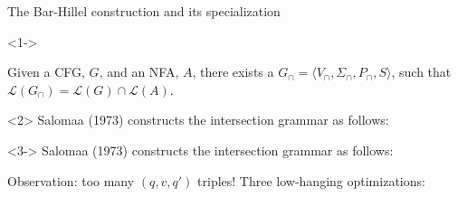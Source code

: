 \documentclass{beamer}
\begin{document}
\begin{frame}[t,fragile]{The Bar-Hillel construction and its specialization}
  \begin{onlyenv}<1->
  \begin{theorem}
    Given a CFG, $G$, and an NFA, $A$, there exists a $G_\cap = \langle V_\cap, \Sigma_\cap, P_\cap, S\rangle$, such that $\mathcal{L}(G_\cap) = \mathcal{L}(G) \cap \mathcal{L}(A)$.
  \end{theorem}
  \end{onlyenv}

  \begin{onlyenv}<2>
  Salomaa (1973) constructs the intersection grammar as follows:\\

  \noindent{}
  \end{onlyenv}

  \begin{onlyenv}<3->
  Salomaa (1973) constructs the intersection grammar as follows:\\

  \noindent{}
  Observation: too many $(q, v, q')$ triples! Three low-hanging optimizations:


\end{onlyenv}
\end{frame}
\end{document}
